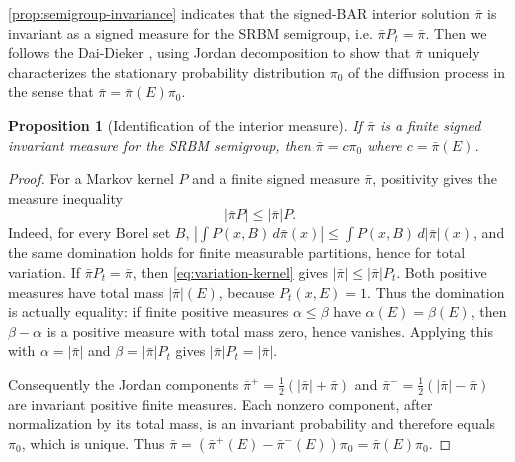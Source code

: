 \documentclass[aihp]{imsart}
\numberwithin{equation}{section}
\theoremstyle{plain}
\newtheorem{proposition}[proposition]{Proposition}
\theoremstyle{definition}
\newcommand{\1}{\mathbf 1}
\newcommand{\norm}[1]{\left\lVert #1\right\rVert}
\newcommand{\abs}[1]{\left\lvert #1\right\rvert}
\begin{document}

\cref{prop:semigroup-invariance} indicates that the signed-BAR interior solution $\bar\pi$ is invariant as a signed measure for the SRBM semigroup, i.e. $\bar\pi P_t=\bar\pi$.
Then we follows the Dai-Dieker \cite{DaiDieker2011}, using Jordan decomposition to show that $\bar\pi$ uniquely characterizes the
stationary probability distribution $\pi_0$ of the diffusion process in the sense that $\bar\pi=\bar\pi(E)\pi_0$. 

\begin{proposition}[Identification of the interior measure]\label{prop:interior-identification}
If $\bar\pi$ is a finite signed invariant measure for the SRBM semigroup, then $\bar\pi=c\pi_0$ where $c=\bar\pi(E)$.
\end{proposition}

\begin{proof}
For a Markov kernel $P$ and a finite signed measure $\bar\pi$, positivity gives the measure inequality
\begin{equation}\label{eq:variation-kernel}
 |\bar\pi P|\le |\bar\pi|P.
\end{equation}
Indeed, for every Borel set $B$,
$|\int P(x,B)\,d\bar\pi(x)|\le\int P(x,B)\,d|\bar\pi|(x)$, and the same domination holds for finite measurable partitions, hence for total variation. If $\bar\pi P_t=\bar\pi$, then \eqref{eq:variation-kernel} gives $|\bar\pi|\le|\bar\pi|P_t$. Both positive measures have total mass $|\bar\pi|(E)$, because $P_t(x,E)=1$. Thus the domination is actually equality: if finite positive measures $\alpha\le\beta$ have $\alpha(E)=\beta(E)$, then $\beta-\alpha$ is a positive measure with total mass zero, hence vanishes. Applying this with $\alpha=|\bar\pi|$ and $\beta=|\bar\pi|P_t$ gives
\(
 |\bar\pi|P_t=|\bar\pi|.
\)

Consequently the Jordan components $\bar\pi^+=\tfrac12(|\bar\pi|+\bar\pi)$ and $\bar\pi^-=\tfrac12(|\bar\pi|-\bar\pi)$ are invariant positive finite measures. Each nonzero component, after normalization by its total mass, is an invariant probability and therefore equals $\pi_0$, which is unique. Thus
\(
 \bar\pi=(\bar\pi^+(E)-\bar\pi^-(E))\pi_0=\bar\pi(E)\pi_0.
\)
\end{proof}
\end{document}
